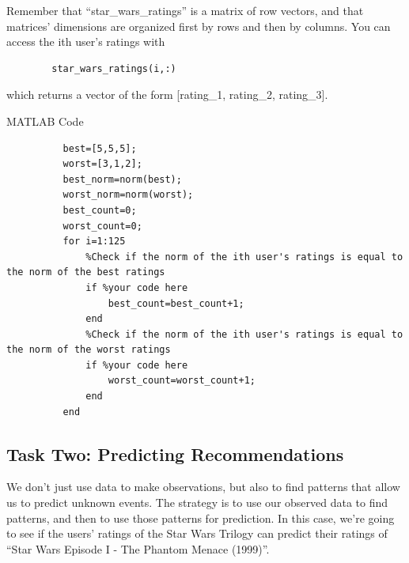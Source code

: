 \documentclass{ximera}
\begin{document}
    \begin{hint}

      Remember that ``star\_wars\_ratings'' is a matrix of row vectors, and that matrices' dimensions are organized first by rows and then by columns. You can access the ith user's ratings with 
      \begin{verbatim}
        star_wars_ratings(i,:)
      \end{verbatim}
      
      which returns a vector of the form [rating\_1, rating\_2, rating\_3].

    \end{hint}

    \begin{hint}{MATLAB Code}
      \begin{verbatim}
          best=[5,5,5];
          worst=[3,1,2];
          best_norm=norm(best);
          worst_norm=norm(worst);
          best_count=0;
          worst_count=0;
          for i=1:125
              %Check if the norm of the ith user's ratings is equal to the norm of the best ratings
              if %your code here
                  best_count=best_count+1;
              end
              %Check if the norm of the ith user's ratings is equal to the norm of the worst ratings
              if %your code here
                  worst_count=worst_count+1;
              end
          end
      \end{verbatim}
    \end{hint}

    \subsection{Task Two: Predicting Recommendations}

    We don't just use data to make observations, but also to find patterns that allow us to predict unknown events. The strategy is to use our observed data to find patterns, and then to use those patterns for prediction. In this case, we're going to see if the users' ratings of the Star Wars Trilogy can predict their ratings of ``Star Wars Episode I - The Phantom Menace (1999)''. 
\end{document}

